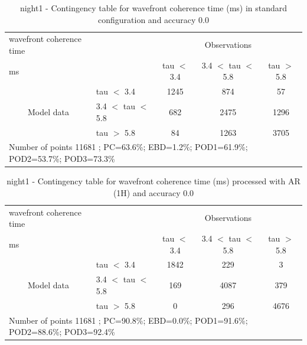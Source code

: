 \clearpage
\begin{table}[p!]
\begin{center}
\begin{tabular}{llccc}
\hline
{wavefront coherence time}                                       &                                                    & \multicolumn{3}{c}{Observations}                 \\
{ms}                                       &                             & tau $<$ 3.4   & 3.4 $<$ tau $<$ 5.8 & tau $>$ 5.8 \\
\hline
\multicolumn{1}{c}{\multirow{3}{*}{Model data}}  & tau $<$ 3.4             & 1245                & 874                       & 57              \\
                                                 & 3.4  $<$ tau $<$ 5.8 & 682                & 2475                       & 1296              \\
                                                 & tau $>$ 5.8             & 84                & 1263                       & 3705              \\
\hline
\multicolumn{5}{l}{ Number of points        11681 ; PC=63.6\%; EBD=1.2\%; POD1=61.9\%; POD2=53.7\%; POD3=73.3\%}
\end{tabular}
\end{center}
\caption{night1 - Contingency table for  wavefront coherence time (ms) in standard configuration and accuracy 0.0}
\label{tab:contingencytauBEF:night1}
\end{table}
\begin{table}[p!]
\begin{center}
\begin{tabular}{llccc}
\hline
{wavefront coherence time}                                       &                                                    & \multicolumn{3}{c}{Observations}                 \\
{ms}                                       &                             & tau $<$ 3.4   & 3.4 $<$ tau $<$ 5.8 & tau $>$ 5.8 \\
\hline
\multicolumn{1}{c}{\multirow{3}{*}{Model data}}  & tau $<$ 3.4             & 1842                & 229                       & 3              \\
                                                 & 3.4  $<$ tau $<$ 5.8 & 169                & 4087                       & 379              \\
                                                 & tau $>$ 5.8             & 0                & 296                       & 4676              \\
\hline
\multicolumn{5}{l}{ Number of points        11681 ; PC=90.8\%; EBD=0.0\%; POD1=91.6\%; POD2=88.6\%; POD3=92.4\%}
\end{tabular}
\end{center}
\caption{night1 - Contingency table for  wavefront coherence time (ms) processed with AR (1H) and accuracy 0.0}
\label{tab:contingencytauAFT:night1}
\end{table}

